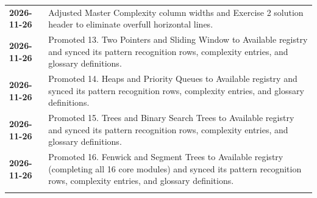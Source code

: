 \documentclass[11pt,a4paper]{article}
\begin{document}
\begin{center}
\begin{tabularx}{\textwidth}{>{\bfseries}l >{\raggedright\arraybackslash}X}
2026-11-26 & Adjusted Master Complexity column widths and Exercise 2 solution header to eliminate overfull horizontal lines. \\
2026-11-26 & Promoted 13. Two Pointers and Sliding Window to Available registry and synced its pattern recognition rows, complexity entries, and glossary definitions. \\
2026-11-26 & Promoted 14. Heaps and Priority Queues to Available registry and synced its pattern recognition rows, complexity entries, and glossary definitions. \\
2026-11-26 & Promoted 15. Trees and Binary Search Trees to Available registry and synced its pattern recognition rows, complexity entries, and glossary definitions. \\
2026-11-26 & Promoted 16. Fenwick and Segment Trees to Available registry (completing all 16 core modules) and synced its pattern recognition rows, complexity entries, and glossary definitions. \\
\arrayrulecolor{primaryblue}\bottomrule[1.2pt]
\end{tabularx}
\endgroup
\end{center}
\end{document}
